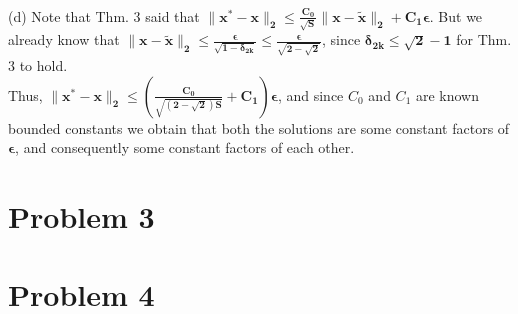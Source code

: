 \documentclass[a4paper,11pt]{article}
\numberwithin{definition}{section}
\numberwithin{mytheorem}{subsection}
\begin{document}
\\
(d) Note that Thm. 3 said that $\boldsymbol{\lVert x^* - x\rVert_2\leq\frac{C_0}{\sqrt{S}}\lVert x-\widetilde{x}\rVert_2 + C_1\epsilon}$. But we already know that $\boldsymbol{\lVert x-\widetilde{x}\rVert_2\leq\frac{\epsilon}{\sqrt{1-\delta_{2k}}}\leq\frac{\epsilon}{\sqrt{2-\sqrt{2}}}}$, since $\boldsymbol{\delta_{2k} \leq \sqrt{2} - 1}$ for Thm. 3 to hold.\\
Thus, $\boldsymbol{\lVert x^* - x\rVert_2\leq(\frac{C_0}{\sqrt{(2-\sqrt{2})S}} + C_1)\epsilon}$, and since $C_0$ and $C_1$ are known bounded constants we obtain that both the solutions are some constant factors of $\boldsymbol{\epsilon}$, and consequently some constant factors of each other.






\section{Problem 3}




\section{Problem 4}
\end{document}
